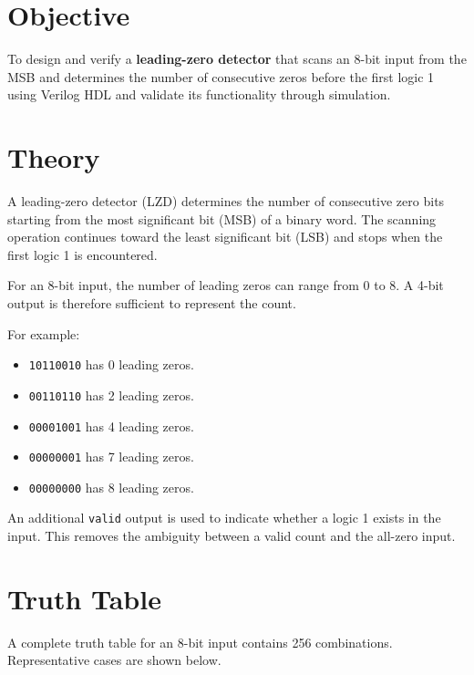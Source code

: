 \documentclass[12pt,a4paper]{report}
\begin{document}
\section{Objective}

To design and verify a \textbf{leading-zero detector} that scans an 8-bit input from the MSB and determines the number of consecutive zeros before the first logic 1 using Verilog HDL and validate its functionality through simulation.

\section{Theory}

A leading-zero detector (LZD) determines the number of consecutive zero bits starting from the most significant bit (MSB) of a binary word. The scanning operation continues toward the least significant bit (LSB) and stops when the first logic 1 is encountered.

For an 8-bit input, the number of leading zeros can range from 0 to 8. A 4-bit output is therefore sufficient to represent the count.

For example:

\begin{itemize}
    \item \texttt{10110010} has 0 leading zeros.
    \item \texttt{00110110} has 2 leading zeros.
    \item \texttt{00001001} has 4 leading zeros.
    \item \texttt{00000001} has 7 leading zeros.
    \item \texttt{00000000} has 8 leading zeros.
\end{itemize}

An additional \texttt{valid} output is used to indicate whether a logic 1 exists in the input. This removes the ambiguity between a valid count and the all-zero input.

\section{Truth Table}

A complete truth table for an 8-bit input contains 256 combinations. Representative cases are shown below.
\end{document}
